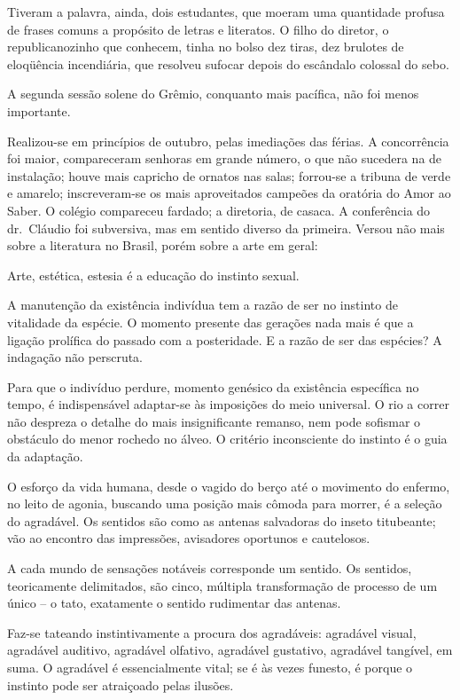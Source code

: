 Tiveram a palavra, ainda, dois
estudantes, que moeram uma quantidade profusa de frases comuns a 
propósito de letras e literatos. O filho do diretor, o republicanozinho
que conhecem, tinha no bolso dez tiras, dez brulotes de eloqüência
incendiária, que resolveu sufocar depois do escândalo colossal do sebo.

A segunda sessão solene do Grêmio, conquanto mais pacífica, não foi
menos importante. 

Realizou{}-se em princípios de outubro, pelas
imediações das férias. A concorrência foi maior, compareceram senhoras
em grande número, o que não sucedera na de instalação; houve mais
capricho de ornatos nas salas; forrou{}-se a tribuna de verde e
amarelo; inscreveram{}-se os mais aproveitados campeões da oratória do
Amor ao Saber. O colégio compareceu fardado; a diretoria, de casaca. A
conferência do dr.~Cláudio foi subversiva, mas em sentido diverso da
primeira. Versou não mais sobre a literatura no Brasil, porém sobre a
arte em geral:

\noindent\dotfill

Arte, estética, estesia é a educação do instinto sexual. 

A manutenção
da existência indivídua tem a razão de ser no instinto de vitalidade da
espécie. O momento presente das gerações nada mais é que a ligação
prolífica do passado com a posteridade. E a razão de ser das espécies?
A indagação não perscruta. 

Para que o indivíduo perdure, momento
genésico da existência específica no tempo, é indispensável
adaptar{}-se às imposições do meio universal. O rio a correr não
despreza o detalhe do mais insignificante remanso, nem pode sofismar o
obstáculo do menor rochedo no álveo. O critério inconsciente do
instinto é o guia da adaptação. 

O esforço da vida humana, desde o
vagido do berço até o movimento do enfermo, no leito de agonia,
buscando uma posição mais cômoda para morrer, é a seleção do agradável.
Os sentidos são como as antenas salvadoras do inseto titubeante; vão ao
encontro das impressões, avisadores oportunos e cautelosos. 

A cada
mundo de sensações notáveis corresponde um sentido. Os sentidos,
teoricamente delimitados, são cinco, múltipla transformação de processo
de um único -- o tato, exatamente o sentido rudimentar das antenas.

Faz{}-se tateando instintivamente a procura dos agradáveis: agradável
visual, agradável auditivo, agradável olfativo, agradável gustativo,
agradável tangível, em suma. O agradável é essencialmente vital; se é
às vezes funesto, é porque o instinto pode ser atraiçoado pelas
ilusões. 

